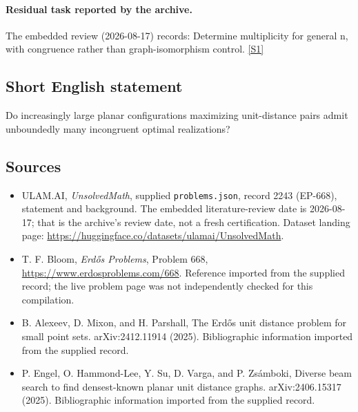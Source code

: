 \documentclass[11pt,a4paper]{article}
\newcommand{\sref}[2]{\hyperlink{source:#1:#2}{[S#2]}}
\begin{document}
\paragraph{Residual task reported by the archive.}

The embedded review (2026-08-17) records: Determine multiplicity for general n, with congruence rather than graph-isomorphism control. \sref{2243}{1}

\subsection{Short English statement}

Do increasingly large planar configurations maximizing unit-distance pairs admit unboundedly many incongruent optimal realizations?

\subsection{Sources}

{\small

\begin{itemize}

\item[\hypertarget{source:2243:1}{S1}] ULAM.AI, \emph{UnsolvedMath}, supplied \texttt{problems.json}, record 2243 (EP-668), statement and background. The embedded literature-review date is 2026-08-17; that is the archive’s review date, not a fresh certification. Dataset landing page: \url{https://huggingface.co/datasets/ulamai/UnsolvedMath}.

\item[\hypertarget{source:2243:2}{S2}] T. F. Bloom, \emph{Erdős Problems}, Problem 668, \url{https://www.erdosproblems.com/668}. Reference imported from the supplied record; the live problem page was not independently checked for this compilation.

\item[\hypertarget{source:2243:3}{S3}] B. Alexeev, D. Mixon, and H. Parshall, The Erd\H{o}s unit distance problem for small point sets. arXiv:2412.11914 (2025). Bibliographic information imported from the supplied record.

\item[\hypertarget{source:2243:4}{S4}] P. Engel, O. Hammond-Lee, Y. Su, D. Varga, and P. Zs\'{a}mboki, Diverse beam search to find densest-known planar unit distance graphs. arXiv:2406.15317 (2025). Bibliographic information imported from the supplied record.

\end{itemize}

}

\label{end:2243}
\end{document}
